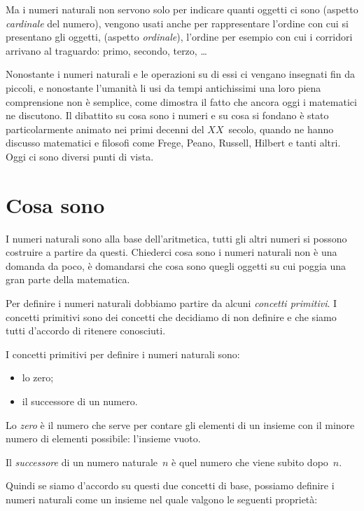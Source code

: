 Ma i numeri naturali non servono solo per indicare quanti oggetti ci sono 
(aspetto \emph{cardinale} del numero), vengono usati anche per 
rappresentare 
l'ordine con cui si presentano gli oggetti, (aspetto \emph{ordinale}), 
l'ordine per esempio con cui i corridori arrivano al traguardo: primo, 
secondo, terzo, \ldots

Nonostante i numeri naturali e le operazioni su di essi ci vengano 
insegnati fin da piccoli, e nonostante l'umanità li usi da tempi 
antichissimi una loro piena comprensione non è semplice, come dimostra il 
fatto che ancora oggi i matematici ne discutono. 
Il dibattito su cosa sono i numeri e su cosa si fondano è stato 
particolarmente animato nei primi decenni del \(XX\)~secolo, quando ne hanno 
discusso matematici e filosofi come Frege, Peano, Russell, Hilbert e tanti 
altri. Oggi ci sono diversi punti di vista.

\section{Cosa sono}
\label{sec:nat_definizione}

I numeri naturali sono alla base dell'aritmetica, 
tutti gli altri numeri si possono costruire a partire da questi. 
Chiederci cosa sono i numeri naturali non è una domanda da poco, 
è domandarsi che cosa sono quegli oggetti su cui poggia una gran parte della
matematica.

Per definire i numeri naturali dobbiamo partire da alcuni 
\emph{concetti primitivi}. 
I concetti primitivi sono dei concetti che decidiamo di non definire e che 
siamo tutti d'accordo di ritenere conosciuti.

I concetti primitivi per definire i numeri naturali sono:

\begin{itemize}[noitemsep]
 \item lo zero;
 \item il successore di un numero.
\end{itemize}

Lo \emph{zero} è il numero che serve per contare gli elementi di un insieme 
con il minore numero di elementi possibile: l'insieme vuoto.

Il \emph{successore} di un numero naturale~\(n\) è quel numero che viene 
subito dopo~\(n\).

Quindi se siamo d'accordo su questi due concetti di base, possiamo definire 
i numeri naturali come un insieme nel quale valgono le seguenti proprietà:


